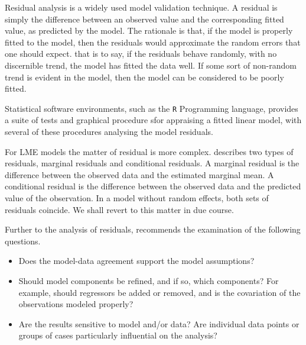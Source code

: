 \documentclass[12pt, a4paper]{article}
\begin{document}
Residual analysis is a widely used model validation technique. A residual is simply the difference between an observed value and the corresponding fitted value, as predicted by the model. The rationale is that, if the model is properly fitted to the model, then the residuals would approximate the random errors that one should expect.
that is to say, if the residuals behave randomly, with no discernible trend, the model has fitted the data well. If some sort of non-random trend is evident in the model, then the model can be considered to be poorly fitted.


Statistical software environments, such as the \texttt{R} Programming language, provides a suite of tests and graphical procedure sfor appraising a fitted linear model, with several 
of these procedures analysing the model residuals.

For LME models the matter of residual is more complex. \citet{schab} describes two types
of residuals, marginal residuals and conditional residuals. A marginal residual is the difference between the observed data and the estimated marginal mean. A conditional residual is the
difference between the observed data and the predicted value of
the observation. In a model without random effects, both sets of
residuals coincide. We shall revert to this matter in due course.

Further to the analysis of residuals, \citet{schab} recommends the examination of the following questions.
\begin{itemize}
	\item Does the model-data agreement support the model assumptions?
	\item Should model components be refined, and if so, which components? For example, should regressors
	be added or removed, and is the covariation of the observations modeled properly?
	\item Are the results sensitive to model and/or data? Are individual data points or groups of cases particularly
	influential on the analysis?
\end{itemize}
\end{document}
